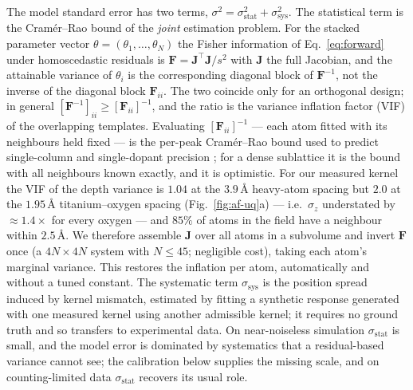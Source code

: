 The model standard error has two terms, $\sigma^2 = \sigma_{\mathrm{stat}}^2 +
\sigma_{\mathrm{sys}}^2$. The statistical term is the Cram\'er--Rao bound of the
\emph{joint} estimation problem. For the stacked parameter vector $\theta=(\theta_1,\dots,
\theta_N)$ the Fisher information of Eq.~\eqref{eq:forward} under homoscedastic residuals is
$\mathbf{F}=\mathbf{J}^{\!\top}\mathbf{J}/s^2$ with $\mathbf{J}$ the full Jacobian, and the
attainable variance of $\theta_i$ is the corresponding diagonal block of $\mathbf{F}^{-1}$,
not the inverse of the diagonal block $\mathbf{F}_{ii}$. The two coincide only for an
orthogonal design; in general $[\mathbf{F}^{-1}]_{ii}\ge[\mathbf{F}_{ii}]^{-1}$, and the
ratio is the variance inflation factor (VIF) of the overlapping templates. Evaluating
$[\mathbf{F}_{ii}]^{-1}$ --- each atom fitted with its neighbours held fixed --- is the
per-peak Cram\'er--Rao bound used to predict single-column and single-dopant precision
\citep{DeBacker2016,Chen2021}; for a dense sublattice it is the bound with all neighbours
known exactly, and it is optimistic. For our measured kernel the VIF of the depth variance
is $1.04$ at the $3.9$\,\AA{} heavy-atom spacing but $2.0$ at the $1.95$\,\AA{}
titanium--oxygen spacing (Fig.~\ref{fig:af-uq}a) --- i.e.\ $\sigma_z$ understated by
${\approx}1.4\times$ for every oxygen --- and $85\%$ of atoms in the field have a neighbour
within $2.5$\,\AA. We therefore
assemble $\mathbf{J}$ over all atoms in a subvolume and invert $\mathbf{F}$ once (a
$4N\times4N$ system with $N\le45$; negligible cost), taking each atom's marginal
variance. This restores the inflation per atom, automatically and without a tuned constant.
The systematic term $\sigma_{\mathrm{sys}}$ is the position spread induced by kernel
mismatch, estimated by fitting a synthetic response generated with one measured kernel using
another admissible kernel; it requires no ground truth and so transfers to experimental
data. On near-noiseless simulation $\sigma_{\mathrm{stat}}$ is small, and the model error is
dominated by systematics that a residual-based variance cannot see; the calibration below
supplies the missing scale, and on counting-limited data $\sigma_{\mathrm{stat}}$ recovers
its usual role.


